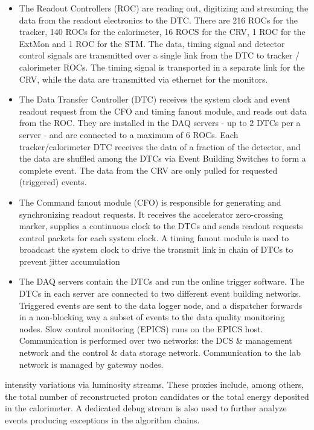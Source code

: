 \begin{itemize} 
\item The Readout Controllers (ROC) are reading out, digitizing and streaming the data from the readout electronics to the DTC. There are 216 ROCs for the tracker, 140 ROCs for the calorimeter, 16 ROCS for the CRV, 1 ROC for the ExtMon and 1 ROC for the STM. The data, timing signal and detector control signals are transmitted over a single link from the DTC to tracker / calorimeter ROCs. The timing signal is transported in a separate link for the CRV, while the data are transmitted via ethernet for the monitors. 

\item The Data Transfer Controller (DTC) receives the system clock and event readout request from the CFO and timing fanout module, and reads out data from the ROC. They are installed in the DAQ servers - up to 2 DTCs per a server - and are connected to a maximum of 6 ROCs. Each tracker/calorimeter DTC receives the data of a fraction of the detector, and the data are shuffled among the DTCs via Event Building Switches to form a complete event. The data from the CRV are only pulled for requested (triggered) events. 

\item The Command fanout module (CFO) is responsible for generating and synchronizing readout requests. It receives the accelerator zero-crossing marker, supplies a continuous clock to the DTCs and sends readout requests control packets for each system clock. A timing fanout module is used to broadcast the system clock to drive the transmit link in chain of DTCs to prevent jitter accumulation

\item The DAQ servers contain the DTCs and run the online trigger software. The DTCs in each server are connected to two different event building networks. Triggered events are sent to the data logger node, and a dispatcher forwards in a non-blocking way a subset of events to the data quality monitoring nodes. Slow control monitoring (EPICS) runs on the EPICS host. Communication is performed over two networks: the DCS \& management network and the control \& data storage network. Communication to the lab network is managed by gateway nodes. 
\end{itemize} 
intensity variations via luminosity streams. These proxies include, among others, the total number of reconstructed proton candidates or the total energy deposited in the calorimeter. A dedicated debug stream is also used to further analyze events producing exceptions in the algorithm chains.  

